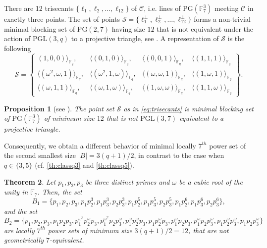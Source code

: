 \documentclass[12pt]{amsart}
\newtheorem{theorem}{Theorem}[section]
\newtheorem{proposition}[theorem]{Proposition}
\newcommand{\F}{{\mathbb F}}
\newcommand{\fq}{{\mathbb F}_{q}}
\newcommand{\PG}{\mathrm{PG}}
\begin{document}
There are 12 trisecants $\{\ell_1, \ell_{2}, \ldots,\ell_{12}\}$ of $\mathcal{C}$, i.e. lines of $\PG(\F_7^3)$ meeting $\mathcal{C}$ in exactly three points. The set of points $\mathcal{S}=\{\ell_1^{\perp}, \ell_{2}^{\perp}, \ldots, \ell_{12}^{\perp}\}$ forms a non-trivial minimal blocking set of $\PG(2,7)$ having size $12$ that is not equivalent under the action of $\mathrm{PGL}(3,q)$ to a projective triangle, see \cite[Theorem 4]{coolsaet2022classification}. A representation of $\mathcal{S}$ is the following 
\begin{equation} \label{eq:trisecants}
\mathcal{S}= \left\{ \begin{array}{cccc}
     (1,0, 0) \rangle_{\fq}, & \langle (0,1,0)\rangle_{\fq}, &\langle (0, 0, 1) \rangle_{\fq}, & \langle (1, 1, 1) \rangle_{\fq}  \\
\langle (\omega^2,\omega, 1) \rangle_{\fq}, & \langle(\omega^2,1,\omega) \rangle_{\fq}, & \langle (\omega, \omega, 1) \rangle_{\fq}, & \langle (1, \omega, 1) \rangle_{\fq} \\
\langle (\omega, 1,1) \rangle_{\fq}, &\langle(\omega,1,\omega) \rangle_{\fq}, &\langle (1,\omega,\omega) \rangle_{\fq}, & \langle (1,1,\omega) \rangle_{\fq}  
\end{array}\right\}.
\end{equation}

\begin{proposition} [see \textnormal{\cite[Theorem 4]{coolsaet2022classification}}] \label{th:classq7}
 The point set $\mathcal{S}$ as in \eqref{eq:trisecants} is minimal blocking set of $\PG(\F_{7}^{3})$ of minimum size $12$ that is not $\mathrm{PGL}(3,7)$ equivalent to a projective triangle.
\end{proposition}

Consequently, we obtain a different behavior of minimal locally $7^{th}$ power set of the second smallest size $\lvert B \rvert=3(q+1)/2$, in contrast to the case when $q \in \{3,5\}$ (cf. \ref{th:classq3} and \ref{th:classq5}).

\begin{theorem} \label{th:upperboundqthpowerset}
Let $p_1,p_2,p_3$ be three distinct primes and $\omega$ be a cubic root of the unity in $\F_7$. Then, the set \[B_{1} = \{p_1,p_2,p_3,p_1p_2^3,p_1p_3^3,p_2p_3^3,p_1p_2^{5},p_1p_3^{5},p_2p_3^{5},p_1p_2^{6},p_1p_3^{6},p_2p_3^{6}\},\]
and the set
\[B_{2} = \{p_1,p_2,p_3,p_1p_2p_3, p_1^{\omega^2}p_2^{\omega}p_3, p_1^{\omega^2}p_2p_3^{\omega}, p_1^{\omega}p_2^{\omega}p_3,p_1p_2^{\omega}p_3,p_1^{\omega}p_2p_3, p_1^{\omega}p_2p_3^{\omega},p_1p_2^{\omega}p_3^{\omega},p_1p_2p_3^{\omega}\}\]
are locally $7^{th}$ power sets of minimum size $3(q+1)/2=12$, that are not geometrically $7$-equivalent.  
\end{theorem}
\end{document}
